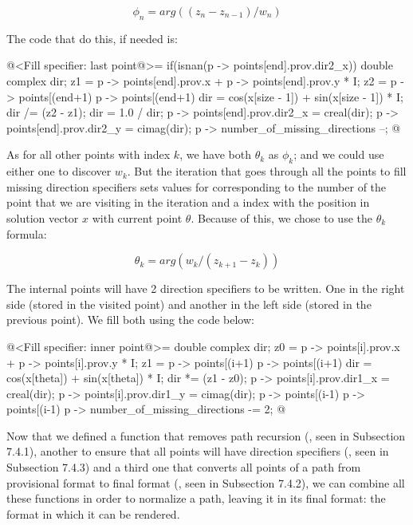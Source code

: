 $$
\phi_n = arg((z_n-z_{n-1})/w_n)
$$

The code that do this, if needed is:

\iniciocodigo
@<Fill specifier: last point@>=
if(isnan(p -> points[end].prov.dir2_x)){
  double complex dir;
  z1 = p -> points[end].prov.x + p -> points[end].prov.y * I;
  z2 = p -> points[(end+1) %
       p -> points[(end+1) %
  dir = cos(x[size - 1]) + sin(x[size - 1]) * I;
  dir /= (z2 - z1);
  dir = 1.0 / dir;
  p -> points[end].prov.dir2_x = creal(dir);
  p -> points[end].prov.dir2_y = cimag(dir);
  p -> number_of_missing_directions --;
}
@
\fimcodigo

As for all other points with index $k$, we have both $\theta_k$ as
$\phi_k$; and we could use either one to discover $w_k$. But the
iteration that goes through all the points to fill missing direction
specifiers sets values for  corresponding to the number
of the point that we are visiting in the iteration and
a  index with the position in solution vector $x$
with current point $\theta$. Because of this, we chose to use the
$\theta_k$ formula:

$$
\theta_k = arg(w_k/(z_{k+1}-z_k))
$$

The internal points will have 2 direction specifiers to be
written. One in the right side (stored in the visited point) and
another in the left side (stored in the previous point). We fill both
using the code below:

\iniciocodigo
@<Fill specifier: inner point@>=
{
  double complex dir;
  z0 = p -> points[i].prov.x + p -> points[i].prov.y * I;
  z1 = p -> points[(i+1) %
       p -> points[(i+1) %
  dir = cos(x[theta]) + sin(x[theta]) * I;
  dir *= (z1 - z0);
  p -> points[i].prov.dir1_x = creal(dir);
  p -> points[i].prov.dir1_y = cimag(dir);
  p -> points[(i-1) %
  p -> points[(i-1) %
  p -> number_of_missing_directions -= 2;
}
@
\fimcodigo


Now that we defined a function that removes path recursion
(, seen in Subsection 7.4.1),
another to ensure that all points will have direction specifiers
(, seen in Subsection 7.4.3) and
a third one that converts all points of a path from provisional format
to final format (, seen in Subsection
7.4.2), we can combine all these functions in order to normalize a
path, leaving it in its final format: the format in which it can
be rendered.

